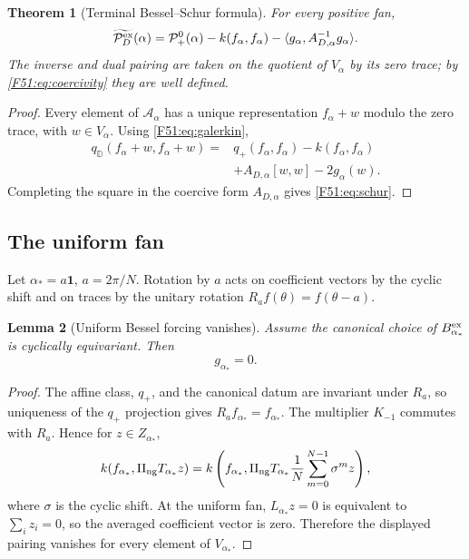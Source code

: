 \documentclass[11pt]{amsart}
\numberwithin{equation}{section}
\newtheorem{theorem}{Theorem}[section]
\newtheorem{lemma}[theorem]{Lemma}
\theoremstyle{definition}
\theoremstyle{remark}
\newcommand{\PiNG}{\Pi_{\rm ng}}
\newcommand{\qD}{q_{\mathbb D}}
\newcommand{\qplus}{q_+}
\newcommand{\Pplus}{\mathcal P_+^0}
\newcommand{\PD}{\mathcal P_D^{\rm ex}}
\begin{document}
\begin{theorem}[Terminal Bessel--Schur formula]\label{F51:thm:schur}
For every positive fan,
\begin{equation}\label{F51:eq:schur}
 \widetilde{\PD}(\alpha)
 =\Pplus(\alpha)-k(f_\alpha,f_\alpha)
 -\langle g_\alpha,A_{D,\alpha}^{-1}g_\alpha\rangle.
\end{equation}
The inverse and dual pairing are taken on the quotient of $V_\alpha$ by its
zero trace; by \eqref{F51:eq:coercivity} they are well defined.
\end{theorem}

\begin{proof}
Every element of $\mathcal A_\alpha$ has a unique representation
$f_\alpha+w$ modulo the zero trace, with $w\in V_\alpha$.  Using
\eqref{F51:eq:galerkin},
\begin{align*}
 \qD(f_\alpha+w,f_\alpha+w)
 ={}&\qplus(f_\alpha,f_\alpha)-k(f_\alpha,f_\alpha)\\
 &+A_{D,\alpha}[w,w]-2g_\alpha(w).
\end{align*}
Completing the square in the coercive form $A_{D,\alpha}$ gives
\eqref{F51:eq:schur}.
\end{proof}

\subsection{The uniform fan}

Let $\alpha_*=a\mathbf1$, $a=2\pi/N$.  Rotation by $a$ acts on coefficient
vectors by the cyclic shift and on traces by the unitary rotation
$R_af(\theta)=f(\theta-a)$.

\begin{lemma}[Uniform Bessel forcing vanishes]\label{F51:lem:gzero}
Assume the canonical choice of $B_{\alpha_*}^{\rm ex}$ is cyclically
equivariant.  Then
\begin{equation}\label{F51:eq:gzero}
 g_{\alpha_*}=0.
\end{equation}
\end{lemma}

\begin{proof}
The affine class, $\qplus$, and the canonical datum are invariant under
$R_a$, so uniqueness of the $\qplus$ projection gives
$R_af_{\alpha_*}=f_{\alpha_*}$.  The multiplier $K_{-1}$ commutes with
$R_a$.  Hence for $z\in Z_{\alpha_*}$,
\begin{equation}
 k(f_{\alpha_*},\PiNG T_{\alpha_*}z)
 =k\left(f_{\alpha_*},\PiNG T_{\alpha_*}
 \frac1N\sum_{m=0}^{N-1}\sigma^m z\right),
\end{equation}
where $\sigma$ is the cyclic shift.  At the uniform fan,
$L_{\alpha_*}z=0$ is equivalent to $\sum_i z_i=0$, so the averaged
coefficient vector is zero.  Therefore the displayed pairing vanishes for
every element of $V_{\alpha_*}$.
\end{proof}
\end{document}
